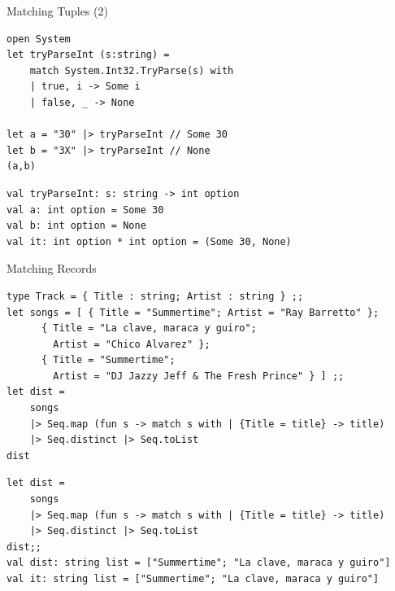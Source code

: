 \documentclass[t]{beamer}
\begin{document}
\begin{frame}[label={sec:orgd1eee75},fragile]{Matching Tuples (2)}
 \begin{verbatim}
open System
let tryParseInt (s:string) =
    match System.Int32.TryParse(s) with 
    | true, i -> Some i
    | false, _ -> None

let a = "30" |> tryParseInt // Some 30
let b = "3X" |> tryParseInt // None
(a,b)
\end{verbatim}

\begin{verbatim}
val tryParseInt: s: string -> int option
val a: int option = Some 30
val b: int option = None
val it: int option * int option = (Some 30, None)
\end{verbatim}
\end{frame}

\begin{frame}[label={sec:orga94dda4},fragile]{Matching Records}
 \begin{verbatim}
type Track = { Title : string; Artist : string } ;;
let songs = [ { Title = "Summertime"; Artist = "Ray Barretto" };
      { Title = "La clave, maraca y guiro";
        Artist = "Chico Alvarez" };
      { Title = "Summertime";
        Artist = "DJ Jazzy Jeff & The Fresh Prince" } ] ;;
let dist = 
    songs 
    |> Seq.map (fun s -> match s with | {Title = title} -> title) 
    |> Seq.distinct |> Seq.toList
dist
\end{verbatim}

\begin{verbatim}
let dist = 
    songs 
    |> Seq.map (fun s -> match s with | {Title = title} -> title) 
    |> Seq.distinct |> Seq.toList
dist;;
val dist: string list = ["Summertime"; "La clave, maraca y guiro"]
val it: string list = ["Summertime"; "La clave, maraca y guiro"]
\end{verbatim}
\end{frame}
\end{document}
